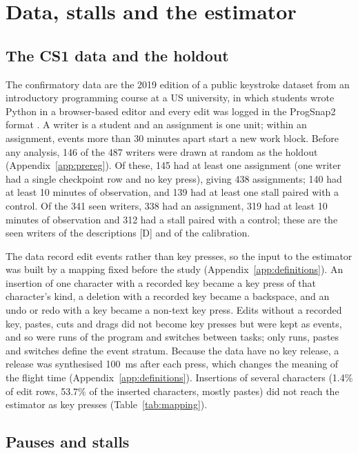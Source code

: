 \section{Data, stalls and the estimator}
\label{sec:data}

\subsection{The CS1 data and the holdout}

The confirmatory data are the 2019 edition of a public keystroke dataset from an introductory programming course at a
US university, in which students wrote Python in a browser-based editor and every edit was logged in the ProgSnap2
format \cite{edwards2023cs1}. A writer is a student and an assignment is one unit; within an assignment, events more than
30 minutes apart start a new work block. Before any analysis, 146 of the 487 writers were drawn at random as the holdout
(Appendix~\ref{app:prereg}). Of these, 145 had at least one assignment (one writer had a single checkpoint row and no key
press), giving 438 assignments; 140 had at least 10 minutes of observation, and 139 had at least one stall paired with
a control. Of the 341 seen writers, 338 had an assignment, 319 had at least 10 minutes of observation and 312 had a stall
paired with a control; these are the seen writers of the descriptions [D] and of the calibration.

The data record edit events rather than key presses, so the input to the estimator was built by a mapping fixed before
the study (Appendix~\ref{app:definitions}). An insertion of one character with a recorded key became a key press of that
character's kind, a deletion with a recorded key became a backspace, and an undo or redo with a key became a non-text
key press. Edits without a recorded key, pastes, cuts and drags did not become key presses but were kept as events, and so were
runs of the program and switches between tasks; only runs, pastes and switches define the event stratum. Because the data have no key release, a release was synthesised 100~ms after each press, which changes the meaning of
the flight time (Appendix~\ref{app:definitions}). Insertions of several characters (1.4\% of edit rows, 53.7\% of the
inserted characters, mostly pastes) did not reach the estimator as key presses (Table~\ref{tab:mapping}).


\subsection{Pauses and stalls}

